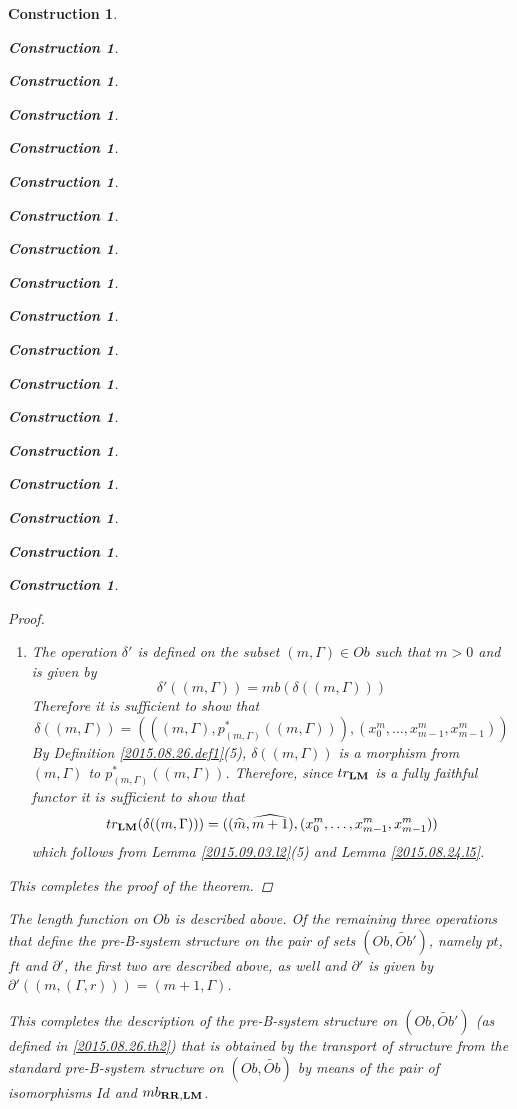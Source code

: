\documentclass[onecolumn,12pt]{amsart}
\numberwithin{proposition}{subsection}
\newtheorem{construction}[proposition]{Construction}
\newcommand{\wt}{\widetilde}
\newcommand{\wh}{\widehat}
\newcommand{\RR}{{\bf RR}}
\newcommand{\LM}{{\bf LM}}
\begin{document}
\begin{construction}
\begin{construction}
\begin{construction}
\begin{construction}
\begin{construction}
\begin{construction}
\begin{construction}
\begin{construction}
\begin{construction}
\begin{construction}
\begin{construction}
\begin{construction}
\begin{construction}
\begin{construction}
\begin{construction}
\begin{construction}
\begin{construction}
\begin{construction}
\begin{proof}
\begin{enumerate}
\begin{equation*}
\begin{split}
    \wt{S}'((m,&(\Gamma,r)),(n,(\Gamma',s)))\\&=mb((mb^!(m,(\Gamma,r)))^*(mb^!((n,(\Gamma',s)))))]=mb(rr^*ss)\\&=
    mb((x_0^{n-1},\dots,x^{n-1}_{n-2},(qq^{n-m-1}(rr))(s)))\\&=(n-1,(rr^*((n+1,\Gamma')),(qq^{n-m-1}(rr))(s)))\\&=
    (n-1,(S'((m,(\Gamma,r)),(n+1,\Gamma'))),\theta_{m,n}(r,s)),
  \end{split}
\end{equation*}
where the third equality is by Lemma \ref{2015.09.03.l1} and the fifth by
(\ref{2016.01.21.eq2}) and the definition of $\theta_{m,n}(r,s)$.
%
\item The operation $\delta'$ is defined on the subset $(m,\Gamma)\in Ob$ such that $m>0$ and is given by
%
$$\delta'((m,\Gamma))=mb(\delta((m,\Gamma)))$$
%
Therefore it is sufficient to show that
%
$$\delta((m,\Gamma))=(((m,\Gamma),p_{(m,\Gamma)}^*((m,\Gamma))),(x_0^m,\dots,x_{m-1}^m,x_{m-1}^m))$$
%
By Definition \ref{2015.08.26.def1}(5), $\delta((m,\Gamma))$ is a morphism from
$(m,\Gamma)$ to $p_{(m,\Gamma)}^*((m,\Gamma))$. Therefore, since $tr_{\LM}$ is
a fully faithful functor it is sufficient to show that
%
$$tr_{\LM}(\delta((m,\Gamma)))=((\wh{m},\wh{m+1}),(x_0^m,\dots,x_{m-1}^m,x_{m-1}^m))$$
%
which follows from Lemma \ref{2015.09.03.l2}(5) and Lemma \ref{2015.08.24.l5}.
%
\end{enumerate}
%
This completes the proof of the theorem. 
\end{proof}
%
The length function on $Ob$ is described above. Of the remaining three
operations that define the pre-B-system structure on the pair of sets
$(Ob,\wt{Ob}')$, namely $pt$, $ft$ and $\partial'$, the first two are described above,
as well and $\partial'$ is given by $\partial'((m,(\Gamma,r)))=(m+1,\Gamma)$.

This completes the description of the pre-B-system structure on $(Ob,\wt{Ob}')$
(as defined in \ref{2015.08.26.th2})
that is obtained by the transport of structure from the standard pre-B-system
structure on $(Ob,\wt{Ob})$ by means of the pair of isomorphisms $Id$ and
$mb_{\RR,\LM}$.


\end{construction}
\end{construction}
\end{construction}
\end{construction}
\end{construction}
\end{construction}
\end{construction}
\end{construction}
\end{construction}
\end{construction}
\end{construction}
\end{construction}
\end{construction}
\end{construction}
\end{construction}
\end{construction}
\end{construction}
\end{construction}
\end{document}
